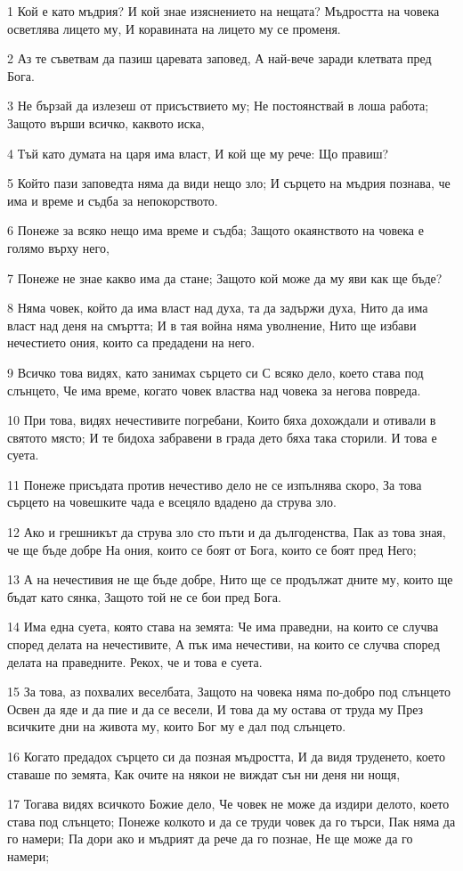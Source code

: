 \par 1 Кой е като мъдрия? И кой знае изяснението на нещата? Мъдростта на човека осветлява лицето му, И коравината на лицето му се променя.
\par 2 Аз те съветвам да пазиш царевата заповед, А най-вече заради клетвата пред Бога.
\par 3 Не бързай да излезеш от присъствието му; Не постоянствай в лоша работа; Защото върши всичко, каквото иска,
\par 4 Тъй като думата на царя има власт, И кой ще му рече: Що правиш?
\par 5 Който пази заповедта няма да види нещо зло; И сърцето на мъдрия познава, че има и време и съдба за непокорството.
\par 6 Понеже за всяко нещо има време и съдба; Защото окаянството на човека е голямо върху него,
\par 7 Понеже не знае какво има да стане; Защото кой може да му яви как ще бъде?
\par 8 Няма човек, който да има власт над духа, та да задържи духа, Нито да има власт над деня на смъртта; И в тая война няма уволнение, Нито ще избави нечестието ония, които са предадени на него.
\par 9 Всичко това видях, като занимах сърцето си С всяко дело, което става под слънцето, Че има време, когато човек властва над човека за негова повреда.
\par 10 При това, видях нечестивите погребани, Които бяха дохождали и отивали в святото място; И те бидоха забравени в града дето бяха така сторили. И това е суета.
\par 11 Понеже присъдата против  нечестиво дело не се изпълнява скоро, За това сърцето на човешките чада е всецяло вдадено да струва зло.
\par 12 Ако и грешникът да струва зло сто пъти и да дългоденства, Пак аз това зная, че ще бъде добре На ония, които се боят от Бога, които се боят пред Него;
\par 13 А на нечестивия не ще бъде добре, Нито ще се продължат дните му, които ще бъдат като сянка,  Защото той не се бои пред Бога.
\par 14 Има една суета, която става на земята: Че има праведни, на които се случва според делата на нечестивите, А пък има нечестиви, на които се случва според делата на праведните. Рекох, че и това е суета.
\par 15 За това, аз похвалих веселбата, Защото на човека няма по-добро под слънцето Освен да яде и да пие и да се весели, И това да му остава от труда му През всичките дни на живота му, които Бог му е дал под слънцето.
\par 16 Когато предадох сърцето си да позная мъдростта, И да видя труденето, което ставаше по земята, Как очите на някои не виждат сън ни деня ни нощя,
\par 17 Тогава видях всичкото Божие дело, Че човек не може да издири делото, което става под слънцето; Понеже колкото и да се труди човек да го търси, Пак няма да го намери; Па дори ако и мъдрият да рече да го познае, Не ще може да го намери;

